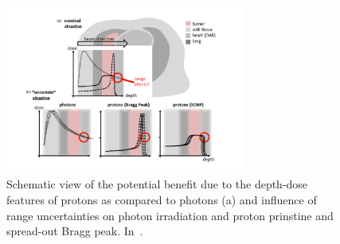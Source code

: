 \begin{figure}[!htbp]
\centering
\includegraphics[width=0.7\textwidth]{03_GraphicFiles/chapter1_Introduction/rangeUnc.pdf}
\caption{Schematic view of the potential benefit due to the depth-dose features of protons as compared to photons (a) and influence of range uncertainties on photon irradiation and proton prinstine and spread-out Bragg peak. In~\cite{Knopf2013}.}
\label{chap1::fig::rangeUnc}
\end{figure} 

